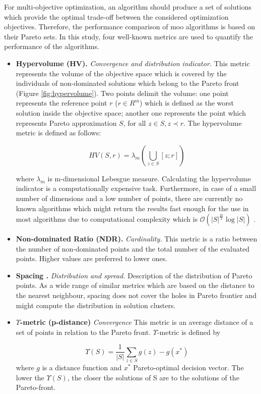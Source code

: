             For multi-objective optimization, an algorithm should produce a set of solutions which provide the optimal trade-off between the considered optimization objectives. Therefore, the performance comparison of \gls{moo} algorithms is based on their Pareto sets. In this study, four well-known metrics are used to quantify the performance of the algorithms.
            \begin{itemize}
                \item \textbf{Hypervolume (HV).}\cite{Zitzler2000ComparisonOM} \textit{Convergence and distribution indicator.}
                This metric represents the volume of the objective space which is covered by the individuals of non-dominated solutions which belong to the Pareto front (Figure \ref{fig:hypervolume}). Two points delimit the volume: one point represents the reference point $r$ ($r \in R^m$) which is defined as the worst solution inside the objective space; another one represents the point which represents Pareto approximation $S$, for all $z \in S, z \prec r$. The hypervolume metric is defined as follows:

                    \[HV(S,r) = \lambda_m(\bigcup\limits_{z \in S} [z;r])\]

                where $\lambda_m$ is m-dimensional Lebesgue measure.    
                Calculating the hypervolume indicator is a computationally expensive task. Furthermore, in case of a small number of dimensions and a low number of points, there are currently no known algorithms which might return the results fast enough for the use in most algorithms due to computational complexity which is 
                $\mathcal{O}(|S|^{\frac{m}{2}}\log{|S|}) $ \cite{BeumeFLPV09}.
                \item \textbf{Non-dominated Ratio (NDR).} \textit{Cardinality.} This metric is a ratio between the number of non-dominated points and the total number of the evaluated points.  Higher values are preferred to lower ones.
                \item \textbf{Spacing \cite{Schott1995FaultTD}.} \textit{Distribution and spread.} Description of the distribution of Pareto points. As a wide range of similar metrics which are based on the distance to the nearest neighbour, spacing does not cover the holes in Pareto frontier and might compute the distribution in solution clusters.
                \item \textbf{$\Upsilon$-metric (p-distance)}\cite{Martens13} \textit{Convergence} This metric is an average distance of a set of points in relation to the Pareto front. $\Upsilon$-metric is defined by

                    \[\Upsilon(S) = \frac{1}{|S|}\sum_{z\in S}g(z)-g(x^*)\]
                where $g$ is a distance function and $x^*$ Pareto-optimal decision vector.
                The lower the $\Upsilon (S)$, the closer the solutions of S are to the solutions of the Pareto-front. 
                
            \end{itemize}

